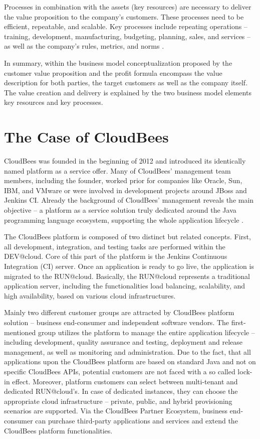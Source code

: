 Processes in combination with the assets (key resources) are necessary to deliver the value proposition to the company's customers. These processes need to be efficient, repeatable, and scalable. Key processes include repeating operations -- training, development, manufacturing, budgeting, planning, sales, and services -- as well as the company's rules, metrics, and norms \citep[p. 53]{Johnson2008}.

In summary, within the business model conceptualization proposed by \citet[p. 54]{Johnson2008} the customer value proposition and the profit formula encompass the value description for both parties, the target customers as well as the company itself. The value creation and delivery is explained by the two business model elements key resources and key processes.



\section{The Case of CloudBees}

CloudBees was founded in the beginning of 2012 and introduced its identically named platform as a service offer. Many of CloudBees' management team members, including the founder, worked prior for companies like Oracle, Sun, IBM, and VMware or were involved in development projects around JBoss and Jenkins CI. Already the background of CloudBees' management reveals the main objective -- a platform as a service solution truly dedicated around the Java programming language ecosystem, supporting the whole application lifecycle \citep{CloudBees2013}.

The CloudBees platform is composed of two distinct but related concepts. First, all development, integration, and testing tasks are performed within the DEV@cloud. Core of this part of the platform is the Jenkins Continuous Integration (CI) server. Once an application is ready to go live, the application is migrated to the RUN@cloud. Basically, the RUN@cloud represents a traditional application server, including the functionalities load balancing, scalability, and high availability, based on various cloud infrastructures.

Mainly two different customer groups are attracted by CloudBees platform solution -- business end-consumer and independent software vendors. The first-mentioned group utilizes the platform to manage the entire application lifecycle -- including development, quality assurance and testing, deployment and release management, as well as monitoring and administration. Due to the fact, that all applications upon the CloudBees platform are based on standard Java and not on specific CloudBees APIs, potential customers are not faced with a so called lock-in effect. Moreover, platform customers can select between multi-tenant and dedicated RUN@cloud's. In case of dedicated instances, they can choose the appropriate cloud infrastructure -- private, public, and hybrid provisioning scenarios are supported. Via the CloudBees Partner Ecosystem, business end-consumer can purchase third-party applications and services and extend the CloudBees platform functionalities. 

